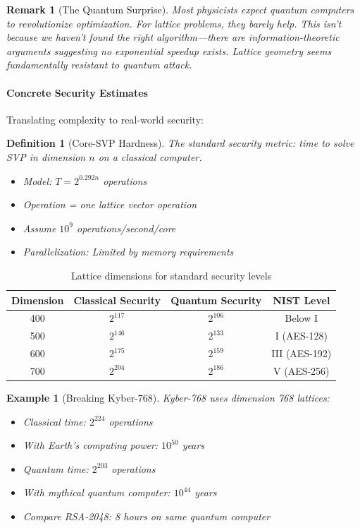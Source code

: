 \documentclass[11pt,a4paper]{article}
\newtheorem{definition}{Definition}
\newtheorem{example}{Example}
\newtheorem{remark}{Remark}
\begin{document}
\begin{remark}[The Quantum Surprise]
Most physicists expect quantum computers to revolutionize optimization. For lattice problems, they barely help. This isn't because we haven't found the right algorithm—there are information-theoretic arguments suggesting no exponential speedup exists. Lattice geometry seems fundamentally resistant to quantum attack.
\end{remark}

\paragraph{Concrete Security Estimates}

Translating complexity to real-world security:

\begin{definition}[Core-SVP Hardness]
The standard security metric: time to solve SVP in dimension $n$ on a classical computer.
\begin{itemize}
    \item Model: $T = 2^{0.292n}$ operations
    \item Operation = one lattice vector operation
    \item Assume $10^9$ operations/second/core
    \item Parallelization: Limited by memory requirements
\end{itemize}
\end{definition}

\begin{table}[h]
\centering
\begin{tabular}{|c|c|c|c|}
\hline
\textbf{Dimension} & \textbf{Classical Security} & \textbf{Quantum Security} & \textbf{NIST Level} \\
\hline
400 & $2^{117}$ & $2^{106}$ & Below I \\
500 & $2^{146}$ & $2^{133}$ & I (AES-128) \\
600 & $2^{175}$ & $2^{159}$ & III (AES-192) \\
700 & $2^{204}$ & $2^{186}$ & V (AES-256) \\
\hline
\end{tabular}
\caption{Lattice dimensions for standard security levels}
\end{table}

\begin{example}[Breaking Kyber-768]
Kyber-768 uses dimension 768 lattices:
\begin{itemize}
    \item Classical time: $2^{224}$ operations
    \item With Earth's computing power: $10^{50}$ years
    \item Quantum time: $2^{203}$ operations  
    \item With mythical quantum computer: $10^{44}$ years
    \item Compare RSA-2048: 8 hours on same quantum computer
\end{itemize}
\end{example}
\end{document}

